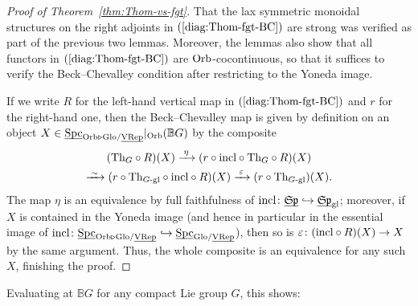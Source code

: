 \documentclass[reqno]{memo-l}
\theoremstyle{mythm}
\theoremstyle{definition}
\numberwithin{equation}{section}
\newcommand{\gl}{\textup{gl}}
\renewcommand{\epsilon}{\varepsilon}
\DeclareMathOperator{\Spc}{Spc}
\newcommand{\Orb}{{\vphantom{\textup{t}}\smash{\textup{Orb}}}}
\newcommand{\Glo}{\textup{Glo}}
\newcommand{\BGcat}[1]{\mathbb B{#1}}
\newcommand{\ulhelper}[2]{\underline{\setbox0=\hbox{$#1#2$}\dp0=0.4pt \box0\relax}}
\newcommand{\ul}[1]{{\mathpalette\ulhelper{#1}}\hbox{\rule[-2pt]{0pt}{0pt}}}
\newcommand{\incl}{{\mathop{\textup{incl}}}}
\newcommand{\iso}{\xrightarrow{\;\smash{\raisebox{-0.25ex}{\ensuremath{\scriptstyle\sim}}}\;}}
\newcommand{\mySp}{{\mathfrak S\kern-.5pt\mathfrak p}}
\newcommand{\Th}{{\textup{Th}}}
\newcommand{\VRep}{\textup{VRep}}
\begin{document}
\begin{proof}[Proof of Theorem~\ref{thm:Thom-vs-fgt}]
    That the lax symmetric monoidal structures on the right adjoints in $(\ref{diag:Thom-fgt-BC})$ are strong was verified as part of the previous two lemmas. Moreover, the lemmas also show that all functors in $(\ref{diag:Thom-fgt-BC})$ are $\Orb$-cocontinuous, so that it suffices to verify the Beck--Chevalley condition after restricting to the Yoneda image.

    If we write $R$ for the left-hand vertical map in $(\ref{diag:Thom-fgt-BC})$ and $r$ for the right-hand one, then the Beck--Chevalley map is given by definition on an object $X\in\ul\Spc_{\Orb\triangleright\Glo/\ul\VRep}|_{\Orb}(\BGcat{G})$ by the composite
    \begin{multline*}
        (\Th_G\circ R)(X)\xrightarrow{\;\eta\;}(r\circ\incl\circ\Th_G\circ R)(X)\\\iso(r\circ \Th_\text{$G$-gl}\circ \incl\circ R)(X)\xrightarrow{\;\epsilon\;}(r\circ\Th_\text{$G$-gl})(X).
    \end{multline*}
    The map $\eta$ is an equivalence by full faithfulness of $\incl\colon\ul\mySp\hookrightarrow\ul\mySp_\gl$; moreover, if $X$ is contained in the Yoneda image (and hence in particular in the essential image of $\incl\colon \ul\Spc_{\Orb\triangleright\Glo/\ul\VRep}\hookrightarrow\ul\Spc_{\Glo/\ul\VRep}$), then so is $\epsilon\colon(\incl\circ R)(X)\to X$ by the same argument. Thus, the whole composite is an equivalence for any such $X$, finishing the proof.
\end{proof}

Evaluating at $\BGcat{G}$ for any compact Lie group $G$, this shows:
\end{document}
